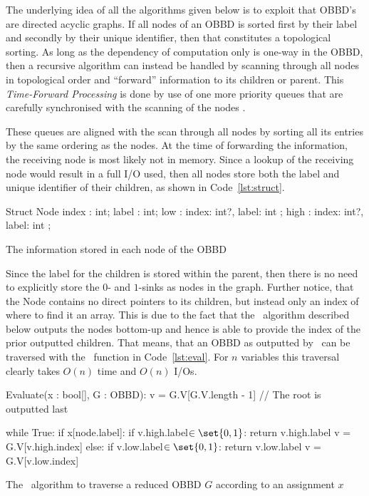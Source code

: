 The underlying idea of all the algorithms given below is to exploit that OBBD's
are directed acyclic graphs. If all nodes of an OBBD is sorted first by their
label and secondly by their unique identifier, then that constitutes a
topological sorting. As long as the dependency of computation only is one-way in
the OBBD, then a recursive algorithm can instead be handled by scanning through
all nodes in topological order and ``forward'' information to its children or
parent. This \emph{Time-Forward Processing} is done by use of one more priority
queues that are carefully synchronised with the scanning of the nodes \todocite.

These queues are aligned with the scan through all nodes by sorting all its
entries by the same ordering as the nodes. At the time of forwarding the
information, the receiving node is most likely not in memory. Since a lookup of
the receiving node would result in a full I/O used, then all nodes store both
the label and unique identifier of their children, as shown in
Code~\ref{lst:struct}.
\begin{lstfloat}
  \centering

  \begin{blstlisting}[language=sml, numbers=none]
  Struct Node {
    index : int;
    label : int;
    low   : { index: int?, label: int };
    high  : { index: int?, label: int };
  }
  \end{blstlisting}

  \caption{The information stored in each node of the OBBD}
  \label{lst:struct}
\end{lstfloat}

Since the label for the children is stored within the parent, then there is no
need to explicitly store the $0$- and $1$-sinks as nodes in the graph. Further
notice, that the Node contains no direct pointers to its children, but instead
only an index of where to find it an array. This is due to the fact that the
\Reduce\ algorithm described below outputs the nodes bottom-up and hence is able
to provide the index of the prior outputted children. That means, that an OBBD
as outputted by \Reduce\ can be traversed with the \Evaluate\ function in
Code~\ref{lst:eval}. For $n$ variables this traversal clearly takes $O(n)$ time
and $O(n)$ I/Os.
\begin{lstfloat}
  \centering

  \begin{blstlisting}[language=pseudocode, numbers=none]
  Evaluate(x : bool[], G : OBBD):
    v = G.V[G.V.length - 1] // The root is outputted last

    while True:
      if x[node.label]:
        if v.high.label$\in \set{0, 1}$: return v.high.label
        v = G.V[v.high.index]
      else:
        if v.low.label$\in \set{0, 1}$:  return v.low.label
        v = G.V[v.low.index]
  \end{blstlisting}

  \caption{The \Evaluate\ algorithm to traverse a reduced OBBD $G$ according to an
    assignment $x$}
  \label{lst:eval}
\end{lstfloat}

